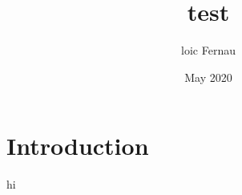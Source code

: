 \documentclass{article}
\title{test}
\author{loic Fernau}
\date{May 2020}
\begin{document}
\maketitle

\section{Introduction}

hi
\end{document}
